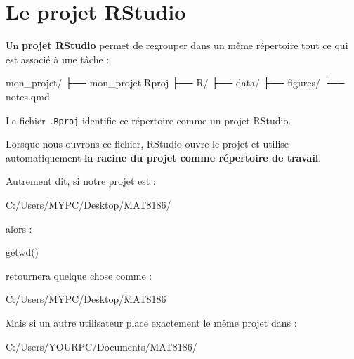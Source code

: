 \documentclass[
  letterpaper,
  DIV=11,
  numbers=noendperiod]{scrreprt}
\newenvironment{Shaded}{\begin{snugshade}}{\end{snugshade}}
\newcommand{\FunctionTok}[1]{\textcolor[rgb]{0.28,0.35,0.67}{#1}}
\newcommand{\NormalTok}[1]{\textcolor[rgb]{0.00,0.23,0.31}{#1}}
\begin{document}
\section{Le projet RStudio}\label{le-projet-rstudio}

Un \textbf{projet RStudio} permet de regrouper dans un même répertoire
tout ce qui est associé à une tâche :

\begin{Shaded}
\begin{Highlighting}[]
\NormalTok{mon\_projet/}
\NormalTok{├── mon\_projet.Rproj}
\NormalTok{├── R/}
\NormalTok{├── data/}
\NormalTok{├── figures/}
\NormalTok{└── notes.qmd}
\end{Highlighting}
\end{Shaded}

Le fichier \texttt{.Rproj} identifie ce répertoire comme un projet
RStudio.

Lorsque nous ouvrons ce fichier, RStudio ouvre le projet et utilise
automatiquement \textbf{la racine du projet comme répertoire de
travail}.

Autrement dit, si notre projet est :

\begin{Shaded}
\begin{Highlighting}[]
\NormalTok{C:/Users/MYPC/Desktop/MAT8186/}
\end{Highlighting}
\end{Shaded}

alors :

\begin{Shaded}
\begin{Highlighting}[]
\FunctionTok{getwd}\NormalTok{()}
\end{Highlighting}
\end{Shaded}

retournera quelque chose comme :

\begin{Shaded}
\begin{Highlighting}[]
\NormalTok{C:/Users/MYPC/Desktop/MAT8186}
\end{Highlighting}
\end{Shaded}

Mais si un autre utilisateur place exactement le même projet dans :

\begin{Shaded}
\begin{Highlighting}[]
\NormalTok{C:/Users/YOURPC/Documents/MAT8186/}
\end{Highlighting}
\end{Shaded}
\end{document}
